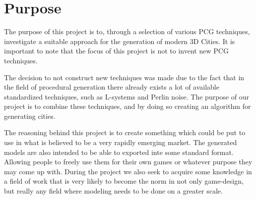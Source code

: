 \section{Purpose}
The purpose of this project is to, through a selection of various PCG techniques, investigate a suitable approach for the generation of modern 3D Cities. It is important to note that the focus of this project is not to invent new PCG techniques.  

The decision to not construct new techniques was made due to the fact that in the field of procedural generation there already exists a lot of available standardized techniques, such as L-systems and Perlin noise. 
The purpose of our project is to combine these techniques, and by doing so creating an algorithm for generating cities. 

The reasoning behind this project is to create something which could be put to use in what is believed to be a very rapidly emerging market. The generated models are also intended to be able to exported inte some standard format. Allowing people to freely use them for their own games or whatever purpose they may come up with. During the project we also seek to acquire some knowledge in a field of work that is very likely to become the norm in not only game-design, but really any field where modeling needs to be done on a greater scale. 

